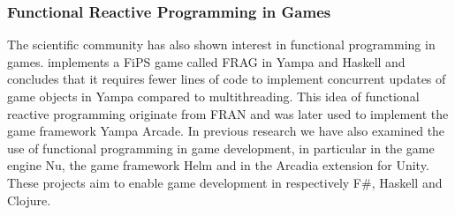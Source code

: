 \subsubsection{Functional Reactive Programming in Games}
The scientific community has also shown interest in functional programming in games. \cite{cheong2005functional} implements a \gls{FiPS} game called FRAG in Yampa and Haskell and concludes that it requires fewer lines of code to implement concurrent updates of game objects in Yampa compared to multithreading. This idea of functional reactive programming originate from FRAN\cite{ElliottHudak97:Fran} and was later used to implement the game framework Yampa Arcade\cite{courtney2003yampa}. In previous research we have also examined the use of functional programming in game development\cite{p92018gameplay}, in particular in the game engine Nu, the game framework Helm and in the Arcadia extension for Unity. These projects aim to enable game development in respectively F\#, Haskell and Clojure.
